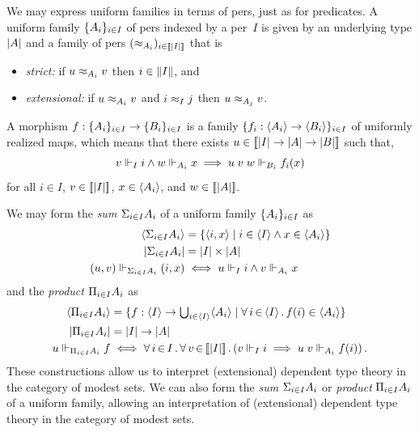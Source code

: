 We may express uniform families in terms of pers, just as for
predicates. A uniform family $\{A_i\}_{i \in I}$ of pers indexed
by a per~$I$ is given by an underlying type $|A|$ and a family
of pers $(\approx_{A_i})_{i \in [\![|I|]\!]}$ that is
% 
\begin{itemize}
\item \emph{strict:} if $u \approx_{A_i} v$ then $i \in \|I\|$, and
\item \emph{extensional:} if $u \approx_{A_i} v$ and $i \approx_I j$ then $u
  \approx_{A_j} v$.
\end{itemize}
%
A morphism $f : \{A_i\}_{i \in I} \to \{B_i\}_{i \in I}$ is a
family $\{f_i : \langle A_i \rangle \to \langle B_i \rangle\}_{i \in I}$ of
uniformly realized maps, which means that there exists $u \in
[\![|I| \to |A| \to |B|]\!]$ such that,
%
\begin{equation*}
  v \Vdash_I i \land w \Vdash_{A_i} x \implies u\; v \; w \Vdash_{B_i} f_i(x)
\end{equation*}
%
for all $i \in I$, $v \in [\![|I|]\!]$, $x \in \langle A_i \rangle$,
and $w \in [\![|A|]\!]$.

\iflong
We may form the \emph{sum} ${\Sigma_{i \in I} A_i}$ of a uniform family
$\{A_i\}_{i \in I}$ as
%
\begin{align*}
  \langle {\Sigma_{i \in I} A_i} \rangle &=
  \{\langle i,x \rangle \mid i \in \langle I \rangle \land x \in \langle A_i \rangle\}
  \\
  |{\Sigma_{i \in I} A_i}| &=
  |I| \times |A|
  \\
  (u,v) \Vdash_{{\Sigma_{i \in I} A_i}} (i,x)
  &\iff
  u \Vdash_I i \land v \Vdash_{A_i} x
\end{align*}
%
and the \emph{product} ${\Pi_{i \in I} A_i}$ as
%
\begin{align*}
  \langle {\Pi_{i \in I} A_i} \rangle &=
  \{f : \langle I \rangle \to {\textstyle \bigcup_{i \in \langle I \rangle} \langle A_i \rangle} \mid
    \forall\, i \,{\in}\, \langle I \rangle\,.\,f(i) \in \langle A_i \rangle\}
  \\
  |{\Pi_{i \in I} A_i}| &=
  |I| \to |A|
  \\
  u \Vdash_{{\Pi_{i \in I} A_i}} f
  &\iff
  \forall\, i \,{\in}\, I\,.\,\forall\, v \,{\in}\, [\![|I|]\!]\,.\left(
      v \Vdash_I i \implies
      u \; v \Vdash_{A_i} f(i)
    \right).
\end{align*}
%
These constructions allow us to interpret (extensional) dependent type
theory in the category of modest sets.
\else
We can also form the \emph{sum} ${\Sigma_{i \in I} A_i}$ or
\emph{product} ${\Pi_{i \in I} A_i}$ of
a uniform family, allowing an interpretation of (extensional) dependent type
theory in the category of modest sets.
\fi

